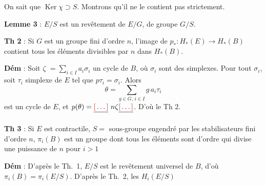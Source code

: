 \documentclass[11pt,a4paper]{article}
\begin{document}
On sait que $\operatorname{Ker} \chi \supset S$. Montrons qu'il ne le
contient pas strictement.

\textbf{Lemme 3} : $E/S$ est un revêtement  de $E/G$, de groupe
$G/S$.

\struck{\ill{}}

\textbf{Th 2} : Si $G$ est un groupe fini d'ordre $n$, l'image de $p_{*} :
H_{*}(E) \to H_{*}(B)$ contient tous les éléments \struck{\ill{}}
divisibles par $n$ dans $H_{*}(B)$.

\textbf{Dém} : Soit $\zeta$ \struck{\ill{}} $= \sum_{i \in I} a_i
\sigma_i$ un cycle de $B$, où $\sigma_i$ sont des simplexes. Pour tout
$\sigma_i$, soit $\tau_i$ simplexe de $E$ tel que $p\tau_i = \sigma_i$.
Alors
\[
\theta = \sum_{g \in G,\, i \in I} g\, a_i \tau_i
\]
est un cycle de $E$, et $p(\theta) = \struck{\ill{}}\ n\zeta \struck{\ill{}}$.
D'où le Th 2.

\textbf{Th 3} : Si \struck{\ill{}} $E$ est \struck{\ill{}} contractile,
$S =$ sous-groupe engendré par les stabilisateurs fini d'ordre $n$,
$\pi_i(B)$ est un groupe \struck{\ill{}} dont tous les éléments sont
d'ordre qui divise une puissance de $n$ pour $i > 1$

\textbf{Dém} : \struck{\ill{}} D'après le Th.\ 1, $E/S$ est le revêtement
universel de $B$, d'où $\pi_i(B) = \pi_i(E/S)$. D'après le Th.\ 2,
\struck{\ill{}} les $H_i(E/S)$
\end{document}
